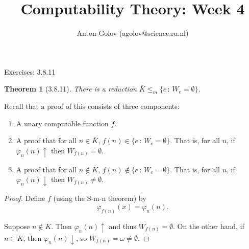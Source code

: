 \documentclass{article}
\title{Computability Theory: Week 4}
\author{Anton Golov (agolov@science.ru.nl)}
\newtheorem{theorem}{Theorem}
\newcommand{\compr}[2]{\{ #1 \,:\, #2 \}}
\newcommand{\terminates}{\!\!\downarrow}
\newcommand{\diverges}{\!\!\uparrow}
\begin{document}
  \maketitle

  Exercises: 3.8.11

  \begin{theorem}[3.8.11]
    There is a reduction $\bar K \le_m \compr{e}{W_e = \emptyset}$.
  \end{theorem}

  Recall that a proof of this consists of three components:
  \begin{enumerate}
    \item A unary computable function $f$.
    \item A proof that for all $n \in \bar K$, $f(n) \in \compr{e}{W_e = \emptyset}$.  That is, for all $n$, if
    $\varphi_n(n)\diverges$ then $W_{f(n)} = \emptyset$.
    \item A proof that for all $n \not \in \bar K$, $f(n) \not \in \compr{e}{W_e = \emptyset}$.  That is, for all $n$,
      if $\varphi_n(n)\terminates$ then $W_{f(n)} \neq \emptyset$.
  \end{enumerate}

  \begin{proof}
    Define $f$ (using the S-m-n theorem) by
    \[
      \varphi_{f(n)}(x) = \varphi_n(n).
    \]

    Suppose $n \not \in K$.  Then $\varphi_n(n)\diverges$ and thus $W_{f(n)} = \emptyset$.  On the other hand, if $n \in
    K$, then $\varphi_n(n)\terminates$, so $W_{f(n)} = \omega \neq \emptyset$.
  \end{proof}
\end{document}
